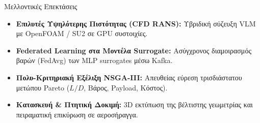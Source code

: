 \begin{frame}{Μελλοντικές Επεκτάσεις}
  \begin{itemize}
    \item \textbf{Επιλυτές Υψηλότερης Πιστότητας (CFD RANS):}
    Υβριδική σύζευξη VLM με OpenFOAM / SU2 σε GPU συστοιχίες.
    
    \vspace{0.15cm}
    \item \textbf{Federated Learning στα Μοντέλα Surrogate:}
    Ασύγχρονος διαμοιρασμός βαρών (FedAvg) των MLP surrogates μέσω Kafka.
    
    \vspace{0.15cm}
    \item \textbf{Πολυ-Κριτηριακή Εξέλιξη NSGA-III:}
    Απευθείας εύρεση τρισδιάστατου μετώπου Pareto ($L/D$, Βάρος, Payload, Κόστος).
    
    \vspace{0.15cm}
    \item \textbf{Κατασκευή \& Πτητική Δοκιμή:}
    3D εκτύπωση της βέλτιστης γεωμετρίας και πειραματική επικύρωση σε αεροσήραγγα.
  \end{itemize}
\end{frame}
